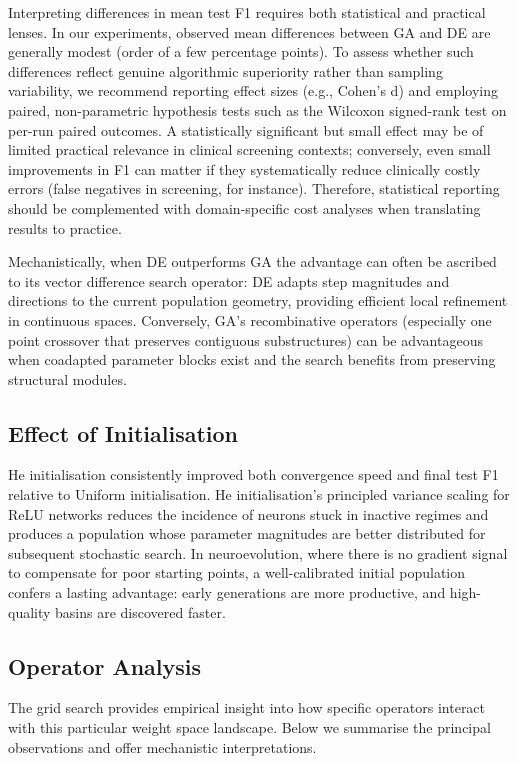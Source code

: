 \documentclass[12pt, a4paper]{article}
\begin{document}
Interpreting differences in mean test F1 requires both statistical and practical lenses. In our experiments, observed mean differences between GA and DE are generally modest (order of a few percentage points). To assess whether such differences reflect genuine algorithmic superiority rather than sampling variability, we recommend reporting effect sizes (e.g., Cohen's d) and employing paired, non-parametric hypothesis tests such as the Wilcoxon signed-rank test on per-run paired outcomes. A statistically significant but small effect may be of limited practical relevance in clinical screening contexts; conversely, even small improvements in F1 can matter if they systematically reduce clinically costly errors (false negatives in screening, for instance). Therefore, statistical reporting should be complemented with domain-specific cost analyses when translating results to practice.

Mechanistically, when DE outperforms GA the advantage can often be ascribed to its vector difference search operator: DE adapts step magnitudes and directions to the current population geometry, providing efficient local refinement in continuous spaces. Conversely, GA's recombinative operators (especially one point crossover that preserves contiguous substructures) can be advantageous when coadapted parameter blocks exist and the search benefits from preserving structural modules.

\subsection{Effect of Initialisation}
He initialisation consistently improved both convergence speed and final test F1 relative to Uniform initialisation. He initialisation's principled variance scaling for ReLU networks reduces the incidence of neurons stuck in inactive regimes and produces a population whose parameter magnitudes are better distributed for subsequent stochastic search. In neuroevolution, where there is no gradient signal to compensate for poor starting points, a well-calibrated initial population confers a lasting advantage: early generations are more productive, and high-quality basins are discovered faster.

\subsection{Operator Analysis}
The grid search provides empirical insight into how specific operators interact with this particular weight space landscape. Below we summarise the principal observations and offer mechanistic interpretations.
\end{document}
